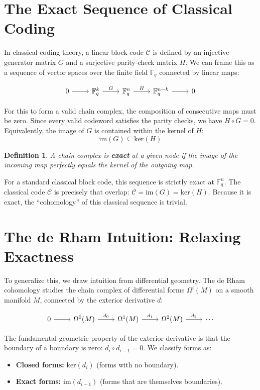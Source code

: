 \documentclass[11pt, a4paper]{article}
\newtheorem{definition}{Definition}
\newcommand{\F}{\mathbb{F}}
\newcommand{\C}{\mathcal{C}}
\newcommand{\im}{\text{im}}
\newcommand{\kerop}{\text{ker}}
\begin{document}
	
	\section{The Exact Sequence of Classical Coding}
	
	In classical coding theory, a linear block code $\C$ is defined by an injective generator matrix $G$ and a surjective parity-check matrix $H$. We can frame this as a sequence of vector spaces over the finite field $\F_q$ connected by linear maps:
	
	\[
	\begin{tikzcd}
		0 \arrow[r] & \F_q^k \arrow[r, "G"] & \F_q^n \arrow[r, "H"] & \F_q^{n-k} \arrow[r] & 0
	\end{tikzcd}
	\]
	
	For this to form a valid chain complex, the composition of consecutive maps must be zero. Since every valid codeword satisfies the parity checks, we have $H \circ G = 0$. Equivalently, the image of $G$ is contained within the kernel of $H$:
	$$ \im(G) \subseteq \kerop(H) $$
	
	\begin{definition}
		A chain complex is \textbf{exact} at a given node if the image of the incoming map perfectly equals the kernel of the outgoing map.
	\end{definition}
	
	For a standard classical block code, this sequence is strictly exact at $\F_q^n$. The classical code $\C$ is precisely that overlap: $\C = \im(G) = \kerop(H)$. Because it is exact, the ``cohomology'' of this classical sequence is trivial.
	
	\section{The de Rham Intuition: Relaxing Exactness}
	
	To generalize this, we draw intuition from differential geometry. The de Rham cohomology studies the chain complex of differential forms $\Omega^i(M)$ on a smooth manifold $M$, connected by the exterior derivative $d$:
	
	\[
	\begin{tikzcd}
		0 \arrow[r] & \Omega^0(M) \arrow[r, "d_0"] & \Omega^1(M) \arrow[r, "d_1"] & \Omega^2(M) \arrow[r, "d_2"] & \cdots
	\end{tikzcd}
	\]
	
	The fundamental geometric property of the exterior derivative is that the boundary of a boundary is zero: $d_{i} \circ d_{i-1} = 0$. We classify forms as:
	\begin{itemize}
		\item \textbf{Closed forms:} $\kerop(d_i)$ (forms with no boundary).
		\item \textbf{Exact forms:} $\im(d_{i-1})$ (forms that are themselves boundaries).
	\end{itemize}
	
\end{document}
